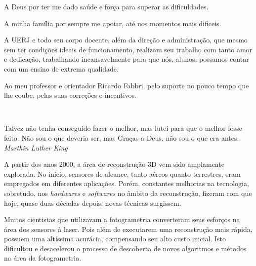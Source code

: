 \documentclass[a4paper,12pt,oneside,onecolumn,final,fleqn]{repUERJ}
\theoremstyle{plain}
\theoremstyle{definition}
\begin{document}


A Deus por ter me dado saúde e força para superar as dificuldades.


A minha família por sempre me apoiar, até nos momentos mais dificeis.


A UERJ e todo seu corpo docente, além da direção e administração, que mesmo sem ter condições ideais de funcionamento, realizam seu trabalho com tanto amor e dedicação, trabalhando incansavelmente para que nós, alunos, possamos contar com um ensino de extrema qualidade.


Ao meu professor e orientador Ricardo Fabbri, pelo suporte no pouco tempo que lhe coube, pelas suas correções e incentivos.


\pretextualchapter{}

  \vfill\
  \begin{flushright}
 Talvez não tenha conseguido fazer o melhor, mas lutei para que o melhor fosse 		 feito. Não sou o que deveria ser, mas Graças a Deus, não sou o que era antes. \\
    \textsl{Marthin Luther King}
  \end{flushright}




A partir dos anos 2000, a área de reconstrução 3D vem sido amplamente explorada. No início, sensores de alcance, tanto aéreos quanto terrestres, eram empregados em diferentes aplicações. Porém, constantes melhorias na tecnologia, sobretudo, nos {\it hardwares} e {\it softwares} no âmbito da reconstrução, fizeram com que hoje, quase duas décadas depois, novas técnicas surgissem.

Muitos cientistas que utilizavam a fotogrametria converteram seus esforços na área dos sensores à laser. Pois além de executarem uma reconstrução mais rápida, possuem uma altíssima acurácia, compensando seu alto custo inicial. Isto dificultou e desacelerou o processo de descoberta de novos algoritmos e métodos na área da fotogrametria. 
\end{document}
